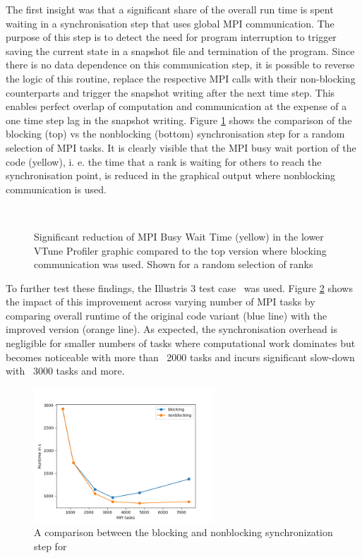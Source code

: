 \documentclass[../main]{subfiles}
\begin{document}
The first insight was that a significant share of the overall run time is spent waiting in a synchronisation step that uses global MPI communication.
The purpose of this step is to detect the need for program interruption to trigger saving the current state in a snapshot file and termination of the program.
Since there is no data dependence on this communication step, it is possible to reverse the logic of this routine, replace the respective MPI calls with their non-blocking counterparts and trigger the snapshot writing after the next time step.
This enables perfect overlap of computation and communication at the expense of a one time step lag in the snapshot writing.
Figure \ref{fig:arepo_mpicom} shows the comparison of the blocking (top) vs the nonblocking (bottom) synchronisation step for a random selection of MPI tasks. It is clearly visible that the MPI busy wait portion of the code (yellow), i. e.  the time that a rank is waiting for others to reach the synchronisation point, is reduced in the graphical output where nonblocking communication is used. 

\begin{figure}[htp]
	\centering
	\\
	\caption{Significant reduction of MPI Busy Wait Time (yellow) in the lower VTune Profiler graphic compared to the top version where blocking communication was used. Shown for a random selection of ranks}
	\label{fig:arepo_mpicom} %
\end{figure}
To further test these findings, the Illustris 3 test case~\cite{Nelson_2015} was used. Figure \ref{fig:arepo_blockvsnonblock} shows the impact of this improvement across varying number of MPI tasks by comparing overall runtime of the original code variant (blue line) with the improved version (orange line). As expected, the synchronisation overhead is negligible for smaller numbers of tasks where computational work dominates but becomes noticeable with more than ~2000 tasks and incurs significant slow-down with ~3000 tasks and more.  
\begin{figure}[htp]
	\centering
	\includegraphics[clip,width=0.6\textwidth]{images/Arepo_blockingvsNonblocking.png}
	\caption{A comparison between the blocking and nonblocking synchronization step for }
	\label{fig:arepo_blockvsnonblock} %
\end{figure}
\end{document}
